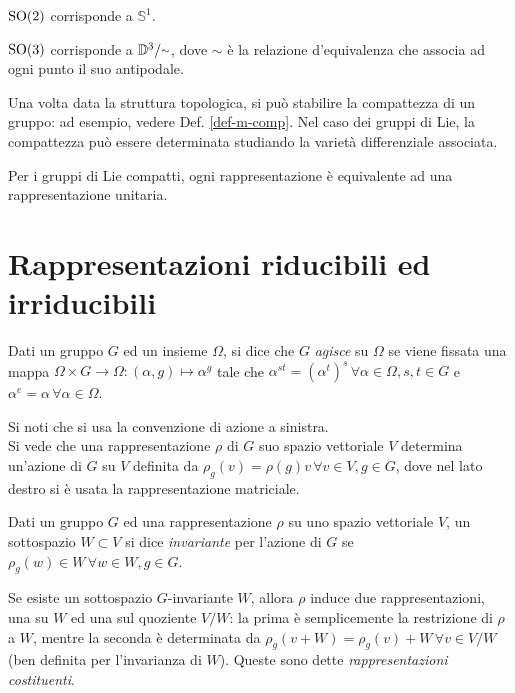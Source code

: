 \begin{example}
	$ \mathrm{SO}(2) $ corrisponde a $ \mathbb{S}^1 $.
\end{example}
\begin{example}
	$ \mathrm{SO}(3) $ corrisponde a $ \mathbb{D}^3 / \tildetext $, dove $ \sim $ è la relazione d'equivalenza che associa ad ogni punto il suo antipodale.
\end{example}

Una volta data la struttura topologica, si può stabilire la compattezza di un gruppo: ad esempio, vedere Def. \ref{def-m-comp}. Nel caso dei gruppi di Lie, la compattezza può essere determinata studiando la varietà differenziale associata.

\begin{proposition}
	Per i gruppi di Lie compatti, ogni rappresentazione è equivalente ad una rappresentazione unitaria.
\end{proposition}

\section{Rappresentazioni riducibili ed irriducibili}

\begin{definition}
	Dati un gruppo $ G $ ed un insieme $ \Omega $, si dice che $ G $ \textit{agisce} su $ \Omega $ se viene fissata una mappa $ \Omega \times G \rightarrow \Omega : (\alpha,g) \mapsto \alpha^g $ tale che $ \alpha^{st} = (\alpha^t)^s \,\forall \alpha \in \Omega, s,t \in G $ e $ \alpha^e = \alpha \,\forall \alpha \in \Omega $.
\end{definition}
Si noti che si usa la convenzione di azione a sinistra.\\
Si vede che una rappresentazione $ \rho $ di $ G $ suo spazio vettoriale $ V $ determina un'azione di $ G $ su $ V $ definita da $ \rho_g(v) = \rho(g) v \,\forall v \in V, g \in G $, dove nel lato destro si è usata la rappresentazione matriciale.

\begin{definition}
	Dati un gruppo $ G $ ed una rappresentazione $ \rho $ su uno spazio vettoriale $ V $, un sottospazio $ W \subset V $ si dice \textit{invariante} per l'azione di $ G $ se $ \rho_g(w) \in W \,\forall w \in W, g \in G $.
\end{definition}

Se esiste un sottospazio $ G $-invariante $ W $, allora $ \rho $ induce due rappresentazioni, una su $ W $ ed una sul quoziente $ V / W $: la prima è semplicemente la restrizione di $ \rho $ a $ W $, mentre la seconda è determinata da $ \rho_g(v + W) = \rho_g(v) + W \,\forall v \in V/W $ (ben definita per l'invarianza di $ W $). Queste sono dette \textit{rappresentazioni costituenti}.

